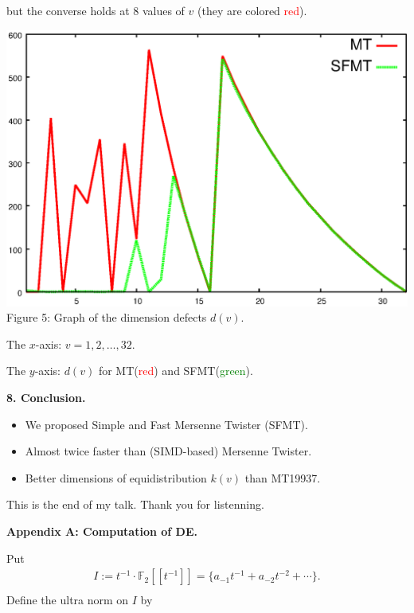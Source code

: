 \documentclass[a4j,12pt,landscape]{jarticle}
\def\F2{{\mathbb F}_2}
\begin{document}
but the converse holds at 8 values of $v$
(they are colored \textcolor{red}{red}).
\newpage
\begin{center}
\includegraphics[width=0.8\linewidth,height=0.7\textheight,
keepaspectratio]{delta.eps}
\\
Figure 5: Graph of the dimension defects $d(v)$.

The $x$-axis: $v=1,2,\ldots, 32$.

The $y$-axis: $d(v)$ for 
MT(\textcolor{red}{red}) and SFMT(\textcolor{green}{green}).
\end{center}

\newpage
{\bf 8. Conclusion.}
\begin{itemize}
\item We proposed Simple and Fast Mersenne Twister (SFMT). 
\item Almost twice faster than (SIMD-based) Mersenne Twister.
\item Better dimensions of equidistribution $k(v)$ than MT19937. 

\end{itemize}
\vspace{\fill}
\begin{center}
This is the end of my talk. Thank you for listenning.
\end{center}
\vskip 1cm

\newpage
{\bf Appendix A: Computation of DE.}

Put
$$
\begin{array}{l}
I:=t^{-1}\cdot \F2[[t^{-1}]]
=\{a_{-1}t^{-1}+a_{-2}t^{-2}+\cdots \}
. \\
\end{array}
$$
Define the ultra norm on $I$ by 
\end{document}
